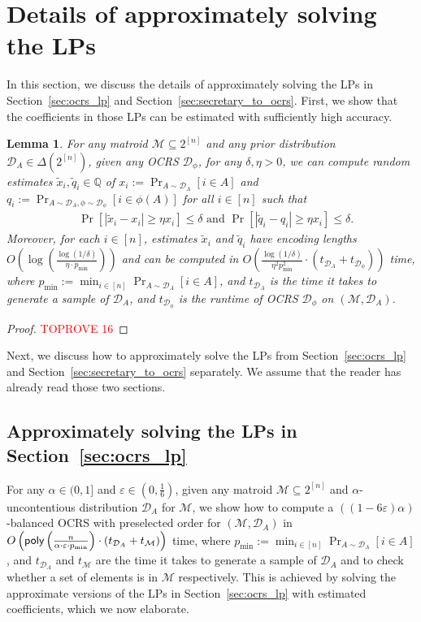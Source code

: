 \documentclass[11pt]{article}
\newcommand{\D}{\mathcal D}
\newcommand{\M}{{\mathcal M}}
\newcommand{\eps}{\varepsilon}
\newcommand{\poly}{\textnormal{\sffamily poly}}
\newcommand{\Q}{{\mathbb Q}}
\newtheorem{lemma}[theorem]{Lemma}
\begin{document}
\section{Details of approximately solving the LPs}\label{sec:approximate_lp_solving}
In this section, we discuss the details of approximately solving the LPs in Section~\ref{sec:ocrs_lp} and Section~\ref{sec:secretary_to_ocrs}. First, we show that the coefficients in those LPs can be estimated with sufficiently high accuracy.
\begin{lemma}\label{lem:estimating_lp_coefficients}
For any matroid $\M\subseteq2^{[n]}$ and any prior distribution $\D_A\in\Delta(2^{[n]})$, given any OCRS $\D_{\phi}$, for any $\delta,\eta>0$, we can compute random estimates $\tilde{x}_i,\tilde{q}_i\in\Q$ of $x_i:=\Pr_{A\sim\D_A}[i\in A]$ and $q_i:=\Pr_{A\sim\D_A,\phi\sim\D_{\phi}}[i\in \phi(A)]$ for all $i\in[n]$ such that
\begin{align*}
&\Pr\left[|\tilde{x}_i-x_i|\ge\eta x_i\right]\le\delta  \text{ and }\Pr\left[|\tilde{q}_i-q_i|\ge\eta x_i\right]\le\delta.
\end{align*}
Moreover, for each $i\in[n]$, estimates $\tilde{x}_i$ and $\tilde{q}_i$ have encoding lengths $O\left(\log\left(\frac{\log(1/\delta)}{\eta\cdot p_{\min}}\right)\right)$ and can be computed in $O\left(\frac{\log(1/\delta)}{\eta^2p_{\min}^2}\cdot(t_{\D_{A}}+t_{\D_{\phi}})\right)$ time, where $p_{\min}:=\min_{i\in[n]}\Pr_{A\sim\D_A}[i\in A]$, and $t_{\D_A}$ is the time it takes to generate a sample of $\D_A$, and $t_{\D_{\phi}}$ is the runtime of OCRS $\D_{\phi}$ on $(\M,\D_A)$.
\end{lemma}
\begin{proof}\textcolor{red}{TOPROVE 16}\end{proof}
Next, we discuss how to approximately solve the LPs from Section~\ref{sec:ocrs_lp} and Section~\ref{sec:secretary_to_ocrs} separately. We assume that the reader has already read those two sections.

\subsection{Approximately solving the LPs in Section~\ref{sec:ocrs_lp}}
For any $\alpha\in(0,1]$ and $\eps\in\left(0,\frac{1}{6}\right)$, given any matroid $\M\subseteq2^{[n]}$ and $\alpha$-uncontentious distribution $\D_A$ for $\M$, we show how to compute a $((1-6\eps)\alpha)$-balanced OCRS with preselected order for $(\M,\D_A)$ in $O\left(\poly\left(\frac{n}{\alpha\cdot\eps\cdot p_{\min}}\right)\cdot(t_{\D_{A}}+t_{\M})\right)$ time, where $p_{\min}:=\min_{i\in[n]}\Pr_{A\sim\D_A}[i\in A]$, and $t_{\D_A}$ and $t_{\M}$ are the time it takes to generate a sample of $\D_A$ and to check whether a set of elements is in $\M$ respectively. This is achieved by solving the approximate versions of the LPs in Section~\ref{sec:ocrs_lp} with estimated coefficients, which we now elaborate.
\end{document}
